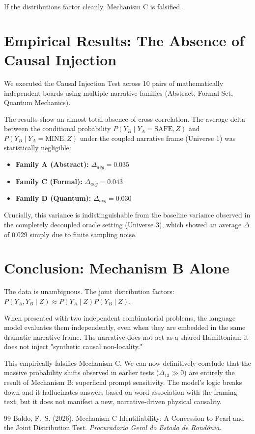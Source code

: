 \documentclass[12pt,a4paper]{article}
\begin{document}
If the distributions factor cleanly, Mechanism C is falsified.

\section{Empirical Results: The Absence of Causal Injection}

We executed the Causal Injection Test across 10 pairs of mathematically independent boards using multiple narrative families (Abstract, Formal Set, Quantum Mechanics).

The results show an almost total absence of cross-correlation. The average delta between the conditional probability $P(Y_B \mid Y_A=\text{SAFE}, Z)$ and $P(Y_B \mid Y_A=\text{MINE}, Z)$ under the coupled narrative frame (Universe 1) was statistically negligible:
\begin{itemize}
    \item \textbf{Family A (Abstract):} $\Delta_{avg} = 0.035$
    \item \textbf{Family C (Formal):} $\Delta_{avg} = 0.043$
    \item \textbf{Family D (Quantum):} $\Delta_{avg} = 0.030$
\end{itemize}

Crucially, this variance is indistinguishable from the baseline variance observed in the completely decoupled oracle setting (Universe 3), which showed an average $\Delta$ of 0.029 simply due to finite sampling noise.

\section{Conclusion: Mechanism B Alone}

The data is unambiguous. The joint distribution factors: $P(Y_A, Y_B \mid Z) \approx P(Y_A \mid Z) P(Y_B \mid Z)$.

When presented with two independent combinatorial problems, the language model evaluates them independently, even when they are embedded in the same dramatic narrative frame. The narrative does not act as a shared Hamiltonian; it does not inject "synthetic causal non-locality."

This empirically falsifies Mechanism C. We can now definitively conclude that the massive probability shifts observed in earlier tests ($\Delta_{13} \gg 0$) are entirely the result of Mechanism B: superficial prompt sensitivity. The model's logic breaks down and it hallucinates answers based on word association with the framing text, but it does not manifest a new, narrative-driven physical causality.

\begin{thebibliography}{99}
 Baldo, F.~S. (2026). Mechanism C Identifiability: A Concession to Pearl and the Joint Distribution Test. \emph{Procuradoria Geral do Estado de Rond\^onia}.
\end{thebibliography}
\end{document}
